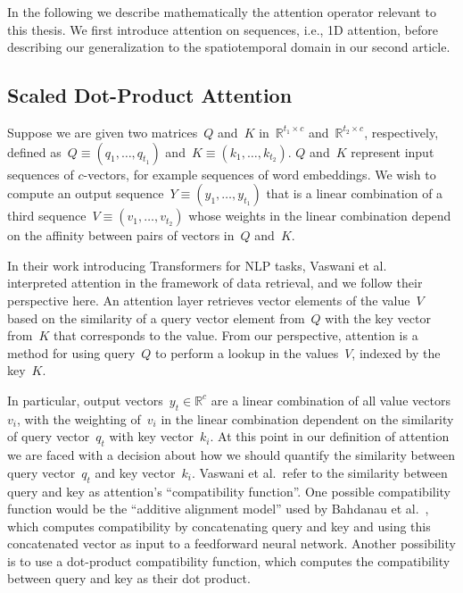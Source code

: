 In the following we describe mathematically the attention operator relevant to
this thesis.
We first introduce attention on sequences, i.e., 1D attention, before
describing our generalization to the spatiotemporal domain in our second
article.


\subsection{Scaled Dot-Product Attention}

Suppose we are given two matrices~$Q$ and~$K$ in~$\mathbb{R}^{t_1 \times c}$
and~$\mathbb{R}^{t_2\times c}$, respectively, defined
as~$Q \equiv (q_1, \dots, q_{t_1})$ and~$K \equiv (k_1, \dots, k_{t_2})$.
$Q$ and~$K$ represent input sequences of $c$-vectors, for example sequences of
word embeddings.
We wish to compute an output sequence~$Y \equiv (y_1, \dots, y_{t_1})$ that is
a linear combination of a third sequence~$V \equiv (v_1, \dots, v_{t_2})$ whose
weights in the linear combination depend on the affinity between pairs of
vectors in~$Q$ and~$K$.

In their work introducing Transformers for NLP tasks, Vaswani et
al.~\cite{vaswani2017attention} interpreted attention in the framework of data
retrieval, and we follow their perspective here.
An attention layer retrieves vector elements of the value~$V$ based on the
similarity of a query vector element from~$Q$ with the key vector from~$K$ that
corresponds to the value.
From our perspective, attention is a method for using query~$Q$ to perform a
lookup in the values~$V$, indexed by the key~$K$.

In particular, output vectors~$y_t \in \mathbb{R}^c$ are a linear combination
of all value vectors~$v_i$, with the weighting of~$v_i$ in the linear
combination dependent on the similarity of query vector~$q_t$ with key
vector~$k_i$.
At this point in our definition of attention we are faced with a decision about
how we should quantify the similarity between query vector~$q_t$ and key
vector~$k_i$.
Vaswani et al.\ refer to the similarity between query and key as attention's
``compatibility function''.
One possible compatibility function would be the ``additive alignment model''
used by Bahdanau et al.~\cite{bahdanau2015neuralmt}, which computes
compatibility by concatenating query and key and using this concatenated vector
as input to a feedforward neural network.
Another possibility is to use a dot-product compatibility function, which
computes the compatibility between query and key as their dot product.

